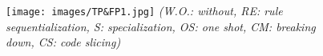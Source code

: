 \begin{figure}[t]
\centering
\texttt{[image: images/TP\&FP1.jpg]}
{\textit{(W.O.: without, RE: rule sequentialization, S: specialization, OS: one shot, CM: breaking down, CS: code slicing)}
}

\vspace{-0.1in}
\end{figure}